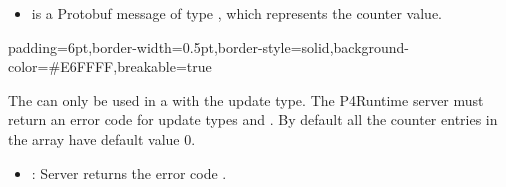 \documentclass[11pt]{article}
\begin{document}
{\begin{itemize}
\item{}
 is a Protobuf message of type , which represents the
counter value.%
\end{itemize}%

\begin{mdbmargintb}{6pt}{6pt}%
\begin{mdblock}{padding=6pt,border-width=0.5pt,border-style=solid,background-color=\#E6FFFF,breakable=true}%
\begin{mdpre}%
\end{mdpre}%
\end{mdblock}%
\end{mdbmargintb}%

\noindent{}The  can only be used in a  with the  update
type. The P4Runtime server must return an  error code for
update types  and . By default all the counter entries in the
array have default value 0.%

\begin{itemize}[noitemsep,topsep=\mdcompacttopsep]%

\item{}: Server returns the error code .%


\end{itemize}}
\end{document}
